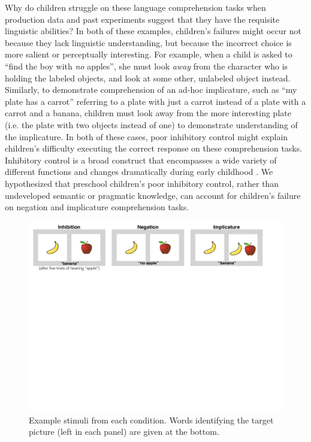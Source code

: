\documentclass[10pt,letterpaper]{article}
\begin{document}
Why do children struggle on these language comprehension tasks when production data and past experiments suggest that they have the requisite linguistic abilities? In both of these examples, children's failures might occur not because they lack linguistic understanding, but because the incorrect choice is more salient or perceptually interesting.  For example, when a child is asked to ``find the boy with \emph{no} apples'', she must look \emph{away} from the character who is holding the labeled objects, and look at some other, unlabeled object instead.  Similarly, to demonstrate comprehension of an ad-hoc implicature, such as ``my plate has a carrot'' referring to a plate with just a carrot instead of a plate with a carrot and a banana, children must look away from the more interesting plate (i.e. the plate with two objects instead of one) to demonstrate understanding of the implicature.  In both of these cases, poor inhibitory control might explain children's difficulty executing the correct response on these comprehension tasks.  Inhibitory control is a broad construct that encompasses a wide variety of different functions \cite{miyake2000} and changes dramatically during early childhood \cite{diamond1996,davidson2006}. We hypothesized that preschool children's poor inhibitory control, rather than undeveloped semantic or pragmatic knowledge, can account for children's failure on negation and implicature comprehension tasks.

\begin{figure}[!th]
\begin{centering}
\includegraphics[width=\textwidth]{figures/stimuli.pdf}
\caption{\label{fig:stimuli} Example stimuli from each condition. Words identifying the target picture (left in each panel) are given at the bottom.}
\end{centering}
\end{figure}
\end{document}
